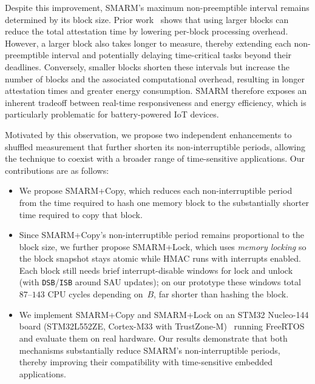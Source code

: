 \documentclass[conference]{IEEEtran}
\newcommand{\smarmcopy}{SMARM+Copy\xspace}
\newcommand{\smarmlock}{SMARM+Lock\xspace}
\begin{document}
Despite this improvement, SMARM's maximum non-preemptible interval remains determined by its block size. Prior work~\cite{smarmplus2026,carpent2018smarm} shows that using larger blocks can reduce the total attestation time by lowering per-block processing overhead. However, a larger block also takes longer to measure, thereby extending each non-preemptible interval and potentially delaying time-critical tasks beyond their deadlines. Conversely, smaller blocks shorten these intervals but increase the number of blocks and the associated computational overhead, resulting in longer attestation times and greater energy consumption. SMARM therefore exposes an inherent tradeoff between real-time responsiveness and energy efficiency, which is particularly problematic for battery-powered IoT devices.

Motivated by this observation, we propose two independent enhancements to shuffled measurement that further shorten its non-interruptible periods, allowing the technique to coexist with a broader range of time-sensitive applications. 
Our contributions are as follows:

\begin{itemize}
\item We propose \smarmcopy, which reduces each non-interruptible period from the time required to hash one memory block to the substantially shorter time required to copy that block.

\item Since \smarmcopy's non-interruptible period remains proportional to the block size, we further propose \smarmlock, which uses \emph{memory locking} so the block snapshot stays atomic while HMAC runs with interrupts enabled. Each block still needs brief interrupt-disable windows for lock and unlock (with \texttt{DSB}/\texttt{ISB} around SAU updates); on our prototype these windows total $87$--$143$ CPU cycles depending on~$B$, far shorter than hashing the block.

\item We implement \smarmcopy and \smarmlock on an STM32 Nucleo-144 board (STM32L552ZE, Cortex-M33 with TrustZone-M)~\cite{stm32nucleo144,stm32l552} running FreeRTOS and evaluate them on real hardware. Our results demonstrate that both mechanisms substantially reduce SMARM's non-interruptible periods, thereby improving their compatibility with time-sensitive embedded applications.

\end{itemize}

\end{document}
